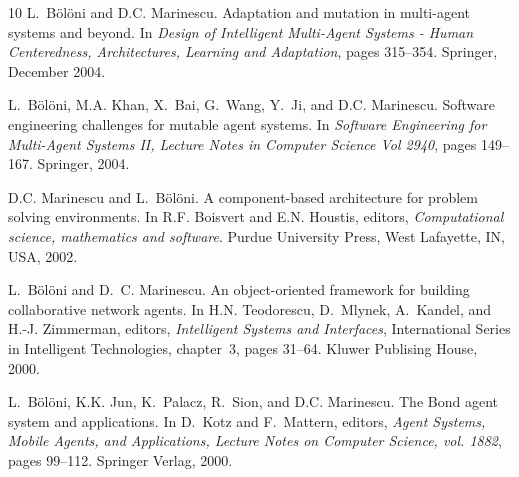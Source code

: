 \begin{thebibliography}{10}
L.~Bölöni and D.C. Marinescu.
\newblock Adaptation and mutation in multi-agent systems and beyond.
\newblock In {\em Design of Intelligent Multi-Agent Systems - Human
  Centeredness, Architectures, Learning and Adaptation}, pages 315--354.
  Springer, December 2004.

L.~Bölöni, M.A. Khan, X.~Bai, G.~Wang, Y.~Ji, and D.C. Marinescu.
\newblock Software engineering challenges for mutable agent systems.
\newblock In {\em Software Engineering for Multi-Agent Systems II, Lecture
  Notes in Computer Science Vol 2940}, pages 149--167. Springer, 2004.

D.C. Marinescu and L.~Bölöni.
\newblock A component-based architecture for problem solving environments.
\newblock In R.F. Boisvert and E.N. Houstis, editors, {\em Computational
  science, mathematics and software}. Purdue University Press, West Lafayette,
  IN, USA, 2002.

L.~B\"ol\"oni and D.~C. Marinescu.
\newblock An object-oriented framework for building collaborative network
  agents.
\newblock In H.N. Teodorescu, D.~Mlynek, A.~Kandel, and H.-J. Zimmerman,
  editors, {\em Intelligent Systems and Interfaces}, International Series in
  Intelligent Technologies, chapter~3, pages 31--64. Kluwer Publising House,
  2000.

L.~Bölöni, K.K. Jun, K.~Palacz, R.~Sion, and D.C. Marinescu.
\newblock The {B}ond agent system and applications.
\newblock In D.~Kotz and F.~Mattern, editors, {\em Agent Systems, Mobile
  Agents, and Applications, Lecture Notes on Computer Science, vol. 1882},
  pages 99--112. Springer Verlag, 2000.

\end{thebibliography}
